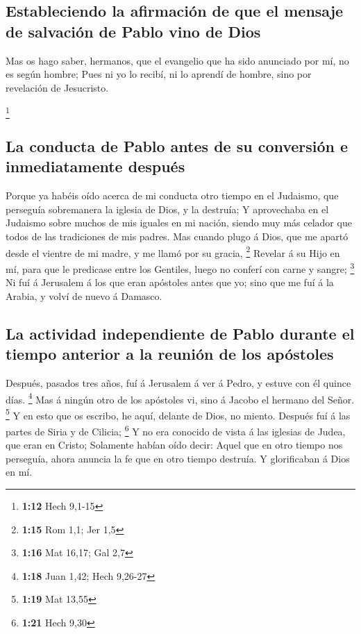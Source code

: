 \hypertarget{estableciendo-la-afirmaciuxf3n-de-que-el-mensaje-de-salvaciuxf3n-de-pablo-vino-de-dios}{%
\subsection{Estableciendo la afirmación de que el mensaje de salvación
de Pablo vino de
Dios}\label{estableciendo-la-afirmaciuxf3n-de-que-el-mensaje-de-salvaciuxf3n-de-pablo-vino-de-dios}}

 Mas os hago saber, hermanos, que el evangelio que ha sido
anunciado por mí, no es según hombre;  Pues ni yo lo
recibí, ni lo aprendí de hombre, sino por revelación de Jesucristo.

\footnote{\textbf{1:12} Hech 9,1-15}

\hypertarget{la-conducta-de-pablo-antes-de-su-conversiuxf3n-e-inmediatamente-despuuxe9s}{%
\subsection{La conducta de Pablo antes de su conversión e inmediatamente
después}\label{la-conducta-de-pablo-antes-de-su-conversiuxf3n-e-inmediatamente-despuuxe9s}}

 Porque ya habéis oído acerca de mi conducta otro tiempo en
el Judaismo, que perseguía sobremanera la iglesia de Dios, y la
destruía;  Y aprovechaba en el Judaismo sobre muchos de mis
iguales en mi nación, siendo muy más celador que todos de las
tradiciones de mis padres.  Mas cuando plugo á Dios, que me
apartó desde el vientre de mi madre, y me llamó por su gracia,
\footnote{\textbf{1:15} Rom 1,1; Jer 1,5}  Revelar á su
Hijo en mí, para que le predicase entre los Gentiles, luego no conferí
con carne y sangre; \footnote{\textbf{1:16} Mat 16,17; Gal 2,7}
 Ni fuí á Jerusalem á los que eran apóstoles antes que yo;
sino que me fuí á la Arabia, y volví de nuevo á Damasco.

\hypertarget{la-actividad-independiente-de-pablo-durante-el-tiempo-anterior-a-la-reuniuxf3n-de-los-apuxf3stoles}{%
\subsection{La actividad independiente de Pablo durante el tiempo
anterior a la reunión de los
apóstoles}\label{la-actividad-independiente-de-pablo-durante-el-tiempo-anterior-a-la-reuniuxf3n-de-los-apuxf3stoles}}

 Después, pasados tres años, fuí á Jerusalem á ver á Pedro,
y estuve con él quince días. \footnote{\textbf{1:18} Juan 1,42; Hech
  9,26-27}  Mas á ningún otro de los apóstoles vi, sino á
Jacobo el hermano del Señor. \footnote{\textbf{1:19} Mat 13,55}
 Y en esto que os escribo, he aquí, delante de Dios, no
miento.  Después fuí á las partes de Siria y de Cilicia;
\footnote{\textbf{1:21} Hech 9,30}  Y no era conocido de
vista á las iglesias de Judea, que eran en Cristo; 
Solamente habían oído decir: Aquel que en otro tiempo nos perseguía,
ahora anuncia la fe que en otro tiempo destruía.  Y
glorificaban á Dios en mí.

